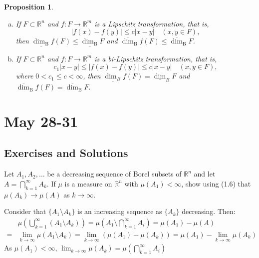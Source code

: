 \documentclass[12pt, a4paper]{article}
\newtheorem{proposition}{Proposition}[subsection]
\begin{document}
\begin{proposition}\label{prop2.5} $ $
    \begin{enumerate}[a.]
        \item If $F \subset \mathbb{R}^{n}$ and $f: F \rightarrow \mathbb{R}^{m}$ is a Lipschitz transformation, that is,
        $$
        |f(x)-f(y)| \leq c|x-y| \quad(x, y \in F),
        $$
        then $\underline{\operatorname{dim}_{\mathrm{B}}} f(F) \leq \underline{\operatorname{dim}_{\mathrm{B}}} F$ and $\overline{\operatorname{dim}}_{\mathrm{B}} f(F) \leq \overline{\operatorname{dim}}_{\mathrm{B}} F$.
        
        \item If $F \subset \mathbb{R}^{n}$ and $f: F \rightarrow \mathbb{R}^{m}$ is a bi-Lipschitz transformation, that is,
        $$
        c_{1}|x-y| \leq|f(x)-f(y)| \leq c|x-y| \quad(x, y \in F),
        $$
        where $0<c_{1} \leq c<\infty$, then $\underline{\operatorname{dim}_{B}} f(F)=\underline{\operatorname{dim}}_{B} F$ and
        $\overline{\operatorname{dim}}_{\mathrm{B}} f(F)=\overline{\operatorname{dim}}_{\mathrm{B}} F .$
        
    \end{enumerate}
\end{proposition}


\newpage
\section{May 28-31}
\subsection{Exercises and Solutions}

\begin{customexercise}{1.18}
    Let $A_{1}, A_{2}, \ldots$ be a decreasing sequence of Borel subsets of $\mathbb{R}^{n}$ and let $A=\bigcap_{k=1}^{\infty} A_{k} .$ If $\mu$ is a measure on $\mathbb{R}^{n}$ with $\mu\left(A_{1}\right)<\infty$, show using (1.6) that $\mu\left(A_{k}\right) \rightarrow \mu(A)$ as $k \rightarrow \infty$.
\end{customexercise}

\begin{customsol}{1.18}
    Consider that $\{A_1\setminus A_k\}$ is an increasing sequence as $\{A_k\}$ decreasing. Then:
    $$ 
    \begin{aligned}
        &\mu\left(\bigcup_{k=1}^{\infty}\left(A_{1}\setminus A_{k}\right)\right) = \mu\left(A_{1} \setminus \bigcap_{k=1}^{\infty} A_{i}\right) = \mu(A_1) - \mu (A) \\
        =&\lim _{k \rightarrow \infty} \mu\left(A_{1} \setminus A_{k}\right) = \lim_{k\rightarrow\infty} (\mu(A_1)-\mu (A_k)) = \mu(A_1) - \lim_{k\rightarrow\infty} \mu(A_k)
    \end{aligned}$$
    As $\mu(A_1)<\infty$, $\displaystyle \lim_{k\rightarrow \infty} \mu(A_k) = \mu(\bigcap_{k=1}^{\infty} A_{i})$
\end{customsol}
\end{document}
